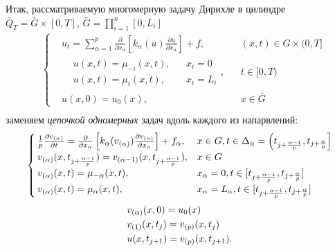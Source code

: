 Итак, рассматриваемую многомерную задачу Дирихле в цилиндре $\bar{Q}_T = \bar{G} \times [0, T]$, $\bar{G} = \prod\limits_{i=1}^{n} [0, L_i]$
\begin{equation*}
    \begin{aligned}
        &\left\{ 
            \begin{aligned}
                & u_t = \sum\limits_{\alpha = 1}^{p} \frac{\partial }{\partial x_{\alpha}} \left[ 
                    k_{\alpha}(u) \frac{\partial u}{\partial x_{\alpha}}
                 \right] + f, && (x, t) \in G \times (0, T]\\
                & \begin{aligned}
                    & u(x, t) = \mu_{-i}(x, t), && x_i = 0\\
                    & u(x, t) = \mu_{i}(x, t), && x_i = L_i
                \end{aligned}, && t \in [0, T)\\
                &u(x, 0) = u_0(x), && x \in \bar{G}
            \end{aligned}
        \right.\\
    \end{aligned}
\end{equation*}
заменяем \emph{цепочкой одномерных} задач \glqq вдоль каждого из напарвлений\grqq:
\begin{equation*}
    \begin{cases}
        \frac{1}{p} \frac{\partial v_{(\alpha)}}{\partial t} = \frac{\partial }{\partial x_{\alpha}} \left[ k_{\alpha}(v_{(\alpha)}) \frac{\partial v_{(\alpha)}}{\partial x_{\alpha}} \right] + f_{\alpha}, &
            x \in G, t \in \Delta_{\alpha} = \left( 
                t_{j + \frac{\alpha - 1}{p}}, 
                t_{j + \frac{\alpha}{p}}
            \right]\\
        v_{(\alpha)}(x, t_{j + \frac{\alpha - 1}{p}}) = v_{(\alpha - 1)}(x, t_{j + \frac{\alpha - 1}{p}}), & x \in G\\
        v_{(\alpha)}(x, t) = \mu_{-\alpha}(x, t), & x_{\alpha} = 0, t \in [t_{j + \frac{\alpha - 1}{p}}, t_{j + \frac{\alpha }{p}}]\\
        v_{(\alpha)}(x, t) = \mu_{\alpha}(x, t), & x_{\alpha} = L_{\alpha}, t \in [t_{j + \frac{\alpha - 1}{p}}, t_{j + \frac{\alpha }{p}}]\\
    \end{cases}
\end{equation*}
\begin{equation*}
    \begin{aligned}
        &v_{(\alpha)}(x, 0) = u_0(x)\\
        & v_{(1)}(x, t_j) = v_{(p)}(x, t_j)\\
        & u(x, t_{j + 1}) = v_{(p)}(x, t_{j + 1}).
    \end{aligned}
\end{equation*}
